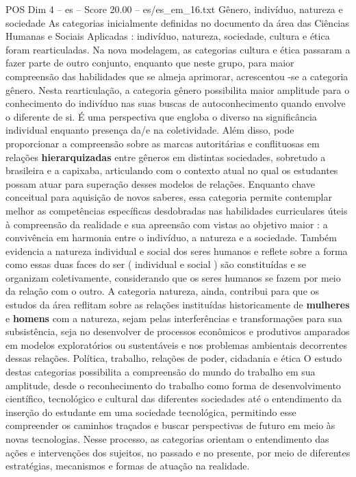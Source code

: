 \begin{textsample}{POS Dim 4 – es – Score 20.00 – es/es\_em\_16.txt}
Gênero, indivíduo, natureza e sociedade As categorias inicialmente definidas no documento da área das Ciências Humanas e Sociais Aplicadas : indivíduo, natureza, sociedade, cultura e ética foram rearticuladas.
Na nova modelagem, as categorias cultura e ética passaram a fazer parte de outro conjunto, enquanto que neste grupo, para maior compreensão das habilidades que se almeja aprimorar, acrescentou -se a categoria gênero.
Nesta rearticulação, a categoria gênero possibilita maior amplitude para o conhecimento do indivíduo nas suas buscas de autoconhecimento quando envolve o diferente de si.
É uma perspectiva que engloba o diverso na significância individual enquanto presença da/e na coletividade.
Além disso, pode proporcionar a compreensão sobre as marcas autoritárias e conflituosas em relações \textbf{hierarquizadas} entre gêneros em distintas sociedades, sobretudo a brasileira e a capixaba, articulando com o contexto atual no qual os estudantes possam atuar para superação desses modelos de relações.
Enquanto chave conceitual para aquisição de novos saberes, essa categoria permite contemplar melhor as competências específicas desdobradas nas habilidades curriculares úteis à compreensão da realidade e sua apreensão com vistas ao objetivo maior : a convivência em harmonia entre o indivíduo, a natureza e a sociedade.
Também evidencia a natureza individual e social dos seres humanos e reflete sobre a forma como essas duas faces do ser ( individual e social ) são constituídas e se organizam coletivamente, considerando que os seres humanos se fazem por meio da relação com o outro.
A categoria natureza, ainda, contribui para que os estudos da área reflitam sobre as relações instituídas historicamente de \textbf{mulheres} e \textbf{homens} com a natureza, sejam pelas interferências e transformações para sua subsistência, seja no desenvolver de processos econômicos e produtivos amparados em modelos exploratórios ou sustentáveis e nos problemas ambientais decorrentes dessas relações.
Política, trabalho, relações de poder, cidadania e ética O estudo destas categorias possibilita a compreensão do mundo do trabalho em sua amplitude, desde o reconhecimento do trabalho como forma de desenvolvimento científico, tecnológico e cultural das diferentes sociedades até o entendimento da inserção do estudante em uma sociedade tecnológica, permitindo esse compreender os caminhos traçados e buscar perspectivas de futuro em meio às novas tecnologias.
Nesse processo, as categorias orientam o entendimento das ações e intervenções dos sujeitos, no passado e no presente, por meio de diferentes estratégias, mecanismos e formas de atuação na realidade.

\end{textsample}
